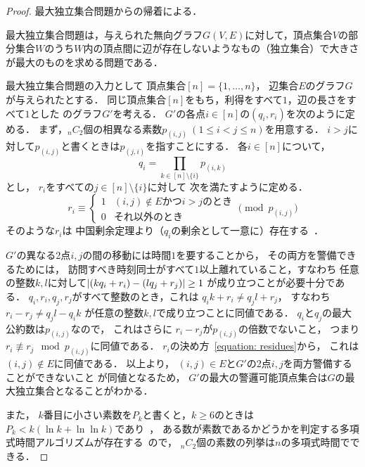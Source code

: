 \begin{proof}
最大独立集合問題からの帰着による．

最大独立集合問題は，与えられた無向グラフ$G(V, E)$に対して，頂点集合$V$の部分集合$W$のうち$W$内の頂点間に辺が存在しないようなもの（独立集合）で大きさが最大のものを求める問題である．

\newcommand{\primenum}[2]{p_{(#1,#2)}}
最大独立集合問題の入力として
頂点集合$[n] = \{1, \ldots, n\}$，
辺集合$E$のグラフ$G$が与えられたとする．
同じ頂点集合$[n]$をもち，利得をすべて$1$，辺の長さをすべて$1$とした
{\graphUnit}のグラフ$G'$を考える．
$G'$の各点$i \in [n]$の{\exactIdletime}$(q_i, r_i)$を次のように定める．
まず，${}_n C_2$個の相異なる素数$\primenum{i}{j}\ (1 \leq i < j \leq n)$を用意する．
$i > j$に対して$\primenum{i}{j}$と書くときは$\primenum{j}{i}$を指すことにする．
各$i \in [n]$について，
\begin{equation}
  q_i = \prod_{k \in [n] \setminus \{i\}} \primenum{i}{k}
\end{equation}
とし，
$r _i$をすべての$j \in [n] \setminus \{i\}$に対して
次を満たすように定める．
\begin{equation}
\label{equation: residues}
  r _i
 \equiv
  \begin{cases}
    1 & \text{$(i, j) \notin E$かつ$i > j$のとき} \\
    0 & \text{それ以外のとき}
  \end{cases}
 \pmod{p _{(i, j)}}
\end{equation}
そのような$r _i$は
中国剰余定理より（$q _i$の剰余として一意に）存在する~\cite{}．

$G'$の異なる2点$i, j$の間の移動には時間$1$を要することから，
その両方を警備できるためには，
訪問すべき時刻同士がすべて$1$以上離れていること，すなわち
任意の整数$k, l$に対して$\lvert{(k q_i + r_i) - (l q_j + r_j)}\rvert \geq 1$%
が成り立つことが必要十分である．
$q_i, r_i, q_j, r_j$がすべて整数のとき，これは
$q_i k + r_i \neq q_j l + r_j$，
すなわち
$r_i - r_j \neq q_j l - q_i k$%
が任意の整数$k, l$で成り立つことに同値である．
$q _i$と$q _j$の最大公約数は$p _{(i, j)}$なので，
これはさらに
$r_i - r_j$が$p _{(i, j)}$の倍数でないこと，
つまり$r_i \not\equiv r_j \mod p _{(i, j)}$に同値である．
$r_i$の決め方~\eqref{equation: residues}から，
これは$(i, j) \notin E$に同値である．
以上より，
$(i, j) \in E$と$G'$の2点$i, j$を両方警備することができないこと
が同値となるため，
$G'$の最大の警邏可能頂点集合は$G$の最大独立集合となることがわかる．

また，
$k$番目に小さい素数を$P_k$と書くと，$k \geq 6$のときは
$P_k < k( \ln k + \ln\ln k )$であり~\cite{dusart1999k}，
ある数が素数であるかどうかを判定する多項式時間アルゴリズムが存在する~\cite{agrawal2004primes}ので，
${}_n C_2$個の素数の列挙は$n$の多項式時間でできる．
\end{proof}





